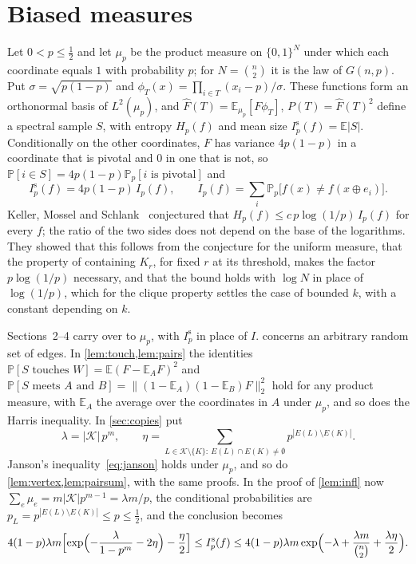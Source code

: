 \documentclass[11pt]{amsart}
\theoremstyle{remark}
\newcommand{\E}{\mathbb{E}}
\renewcommand{\Pr}{\mathbb{P}}
\newcommand{\bits}{\{0,1\}}
\newcommand{\K}{\mathcal K}
\begin{document}
\section{Biased measures}\label{sec:biased}

Let $0<p\le\frac12$ and let $\mu_p$ be the product measure on $\bits^N$ under which each coordinate equals $1$ with
probability $p$; for $N=\binom n2$ it is the law of $G(n,p)$. Put $\sigma=\sqrt{p(1-p)}$ and
$\phi_T(x)=\prod_{i\in T}(x_i-p)/\sigma$. These functions form an orthonormal basis of $L^2(\mu_p)$, and
$\widehat F(T)=\E_{\mu_p}[F\phi_T]$, $P(T)=\widehat F(T)^2$ define a spectral sample $S$, with entropy $H_p(f)$ and
mean size $I^{\mathrm s}_p(f)=\E|S|$. Conditionally on the other coordinates, $F$ has variance $4p(1-p)$ in a
coordinate that is pivotal and $0$ in one that is not, so $\Pr[i\in S]=4p(1-p)\Pr_p[i\text{ is pivotal}]$ and
\[
I^{\mathrm s}_p(f)=4p(1-p)\,I_p(f),\qquad I_p(f)=\sum_i\Pr_p\bigl[f(x)\ne f(x\oplus e_i)\bigr].
\]
Keller, Mossel and Schlank~\cite[Conjecture~1.6]{KMS12} conjectured that $H_p(f)\le c\,p\log(1/p)\,I_p(f)$ for every
$f$; the ratio of the two sides does not depend on the base of the logarithms. They showed that this follows from the conjecture for the uniform measure, that the property of
containing $K_r$, for fixed $r$ at its threshold, makes the factor $p\log(1/p)$ necessary, and that the bound holds
with $\log N$ in place of $\log(1/p)$, which for the clique property settles the case of bounded $k$, with a
constant depending on $k$.

Sections~2--4 carry over to $\mu_p$, with $I^{\mathrm s}_p$ in place of $I$.  concerns an
arbitrary random set of edges. In \cref{lem:touch,lem:pairs} the identities
$\Pr[S\text{ touches }W]=\E(F-\E_AF)^2$ and $\Pr[S\text{ meets $A$ and $B$}]=\|(1-\E_A)(1-\E_B)F\|_2^2$ hold for any
product measure, with $\E_A$ the average over the coordinates in $A$ under $\mu_p$, and so does the Harris
inequality. In \cref{sec:copies} put
\[
\lambda=|\K|\,p^m,\qquad \eta=\sum_{L\in\K\setminus\{K\}:\ E(L)\cap E(K)\neq\emptyset}p^{|E(L)\setminus E(K)|}.
\]
Janson's inequality~\eqref{eq:janson} holds under $\mu_p$, and so do \cref{lem:vertex,lem:pairsum}, with the same
proofs. In the proof of \cref{lem:infl} now $\sum_e\mu_e=m|\K|p^{m-1}=\lambda m/p$, the conditional probabilities are
$p_L=p^{|E(L)\setminus E(K)|}\le p\le\frac12$, and the conclusion becomes
\begin{equation}\label{eq:inflp}
4(1-p)\lambda m\Bigl[\exp\Bigl(-\frac\lambda{1-p^m}-2\eta\Bigr)-\frac\eta2\Bigr]\le I^{\mathrm s}_p(f)
\le4(1-p)\lambda m\exp\Bigl(-\lambda+\frac{\lambda m}{\binom n2}+\frac{\lambda\eta}2\Bigr).
\end{equation}
\end{document}
